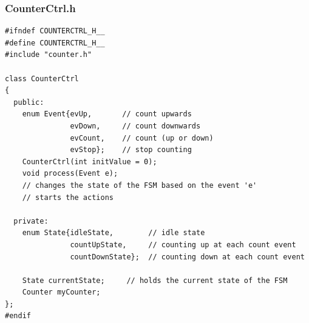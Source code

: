 \subsubsection{CounterCtrl.h}
\begin{lstlisting}[style=Csharp]
#ifndef COUNTERCTRL_H__
#define COUNTERCTRL_H__
#include "counter.h"

class CounterCtrl
{
  public:
    enum Event{evUp,       // count upwards
               evDown,     // count downwards
               evCount,    // count (up or down)
               evStop};    // stop counting
    CounterCtrl(int initValue = 0);
    void process(Event e);
    // changes the state of the FSM based on the event 'e'
    // starts the actions

  private:
    enum State{idleState,        // idle state
               countUpState,     // counting up at each count event
               countDownState};  // counting down at each count event

    State currentState;     // holds the current state of the FSM
    Counter myCounter;
};
#endif
\end{lstlisting}

